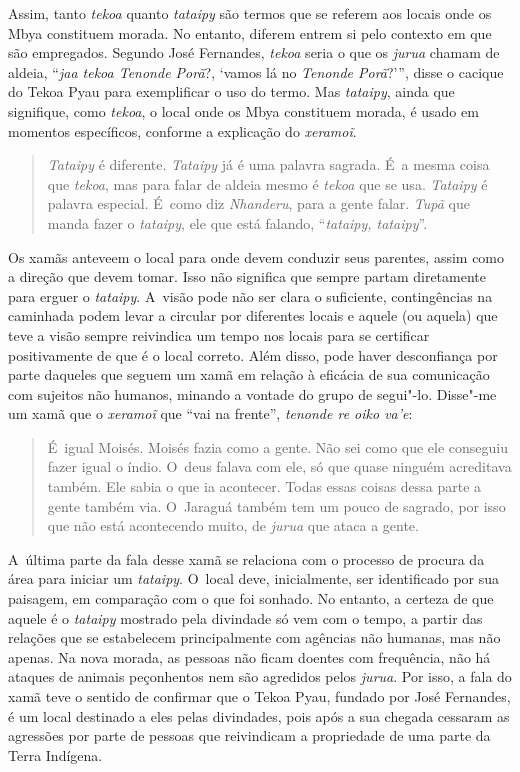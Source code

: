 Assim, tanto \emph{tekoa} quanto \emph{tataipy} são termos que se referem aos locais
onde os Mbya constituem morada. No entanto, diferem entrem si pelo
contexto em que são empregados. Segundo José Fernandes, \emph{tekoa} seria o
que os \emph{jurua} chamam de aldeia, ``\emph{jaa tekoa Tenonde Porã}?, ‘vamos lá no
\emph{Tenonde Porã}?’'', disse o cacique do Tekoa Pyau para exemplificar o uso
do termo. Mas \emph{tataipy}, ainda que signifique, como \emph{tekoa}, o local onde
os Mbya constituem morada, é usado em momentos específicos, conforme a
explicação do \emph{xeramoĩ}. 

\begin{quote}
\emph{Tataipy} é diferente. \emph{Tataipy} já é uma palavra sagrada. É~a mesma coisa
que \emph{tekoa}, mas para falar de aldeia mesmo é \emph{tekoa} que se usa. \emph{Tataipy} é
palavra especial. É~como diz \emph{Nhanderu}, para a gente falar. \emph{Tupã} que
manda fazer o \emph{tataipy}, ele que está falando, ``\emph{tataipy, tataipy}''.
\end{quote}

Os xamãs anteveem o local para onde devem conduzir seus parentes, assim
como a direção que devem tomar. Isso não significa que sempre partam
diretamente para erguer o \emph{tataipy}. A~visão pode não ser clara o
suficiente, contingências na caminhada podem levar a circular por
diferentes locais e aquele (ou aquela) que teve a visão sempre
reivindica um tempo nos locais para se certificar positivamente de que
é o local correto. Além disso, pode haver desconfiança por parte
daqueles que seguem um xamã em relação à eficácia de sua comunicação
com sujeitos não humanos, minando a vontade do grupo de segui"-lo.
Disse"-me um xamã que o \emph{xeramoĩ} que ``vai na
frente'', \emph{tenonde re oiko va’e}:

\begin{quote}
É~igual Moisés. Moisés fazia como a gente. Não sei como que ele
conseguiu fazer igual o índio. O~deus falava com ele, só que quase
ninguém acreditava também. Ele sabia o que ia acontecer. Todas essas
coisas dessa parte a gente também via. O~Jaraguá também tem um pouco de
sagrado, por isso que não está acontecendo muito, de \emph{jurua} que
ataca a gente.
\end{quote}

A~última parte da fala desse xamã se relaciona com o processo de procura
da área para iniciar um \emph{tataipy}. O~local deve, inicialmente, ser
identificado por sua paisagem, em comparação com o que foi sonhado. No
entanto, a certeza de que aquele é o \emph{tataipy} mostrado pela
divindade só vem com o tempo, a partir das relações que se estabelecem
principalmente com agências não humanas, mas não apenas. Na nova morada,
as pessoas não ficam doentes com frequência, não há ataques de animais
peçonhentos nem são agredidos pelos \emph{jurua}. Por isso, a fala do
xamã teve o sentido de confirmar que o Tekoa Pyau, fundado por José
Fernandes, é um local destinado a eles pelas divindades, pois após a
sua chegada cessaram as agressões por parte de pessoas que reivindicam
a propriedade de uma parte da Terra Indígena.

